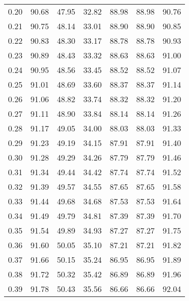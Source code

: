 \begin{tabular}{|c|c|c|c|c|c|c|}
      0.20 &     90.68 &     47.95 &      32.82 &   88.98 &      88.98 &         90.76 \\
      0.21 &     90.75 &     48.14 &      33.01 &   88.90 &      88.90 &         90.85 \\
      0.22 &     90.83 &     48.30 &      33.17 &   88.78 &      88.78 &         90.93 \\
      0.23 &     90.89 &     48.43 &      33.32 &   88.63 &      88.63 &         91.00 \\
      0.24 &     90.95 &     48.56 &      33.45 &   88.52 &      88.52 &         91.07 \\
      0.25 &     91.01 &     48.69 &      33.60 &   88.37 &      88.37 &         91.14 \\
      0.26 &     91.06 &     48.82 &      33.74 &   88.32 &      88.32 &         91.20 \\
      0.27 &     91.11 &     48.90 &      33.84 &   88.14 &      88.14 &         91.26 \\
      0.28 &     91.17 &     49.05 &      34.00 &   88.03 &      88.03 &         91.33 \\
      0.29 &     91.23 &     49.19 &      34.15 &   87.91 &      87.91 &         91.40 \\
      0.30 &     91.28 &     49.29 &      34.26 &   87.79 &      87.79 &         91.46 \\
      0.31 &     91.34 &     49.44 &      34.42 &   87.74 &      87.74 &         91.52 \\
      0.32 &     91.39 &     49.57 &      34.55 &   87.65 &      87.65 &         91.58 \\
      0.33 &     91.44 &     49.68 &      34.68 &   87.53 &      87.53 &         91.64 \\
      0.34 &     91.49 &     49.79 &      34.81 &   87.39 &      87.39 &         91.70 \\
      0.35 &     91.54 &     49.89 &      34.93 &   87.27 &      87.27 &         91.75 \\
      0.36 &     91.60 &     50.05 &      35.10 &   87.21 &      87.21 &         91.82 \\
      0.37 &     91.66 &     50.15 &      35.24 &   86.95 &      86.95 &         91.89 \\
      0.38 &     91.72 &     50.32 &      35.42 &   86.89 &      86.89 &         91.96 \\
      0.39 &     91.78 &     50.43 &      35.56 &   86.66 &      86.66 &         92.04 \\

\end{tabular}
